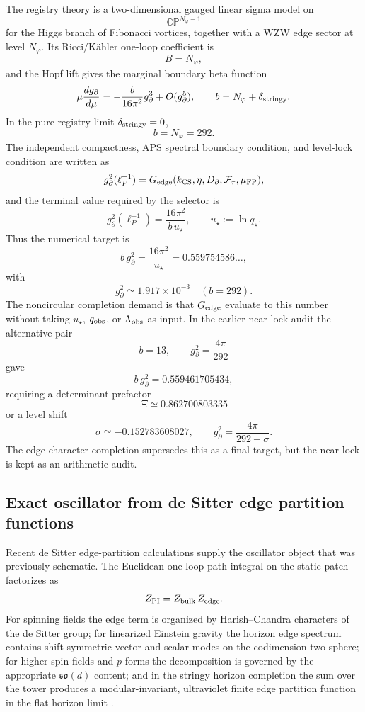 \documentclass[aps,prd,reprint,nofootinbib,superscriptaddress,floatfix]{revtex4-2}
\numberwithin{equation}{section}
\theoremstyle{definition}
\theoremstyle{plain}
\begin{document}
The registry theory is a two-dimensional gauged linear sigma model on
\[
\mathbb{CP}^{N_\varphi-1}
\]
for the Higgs branch of Fibonacci vortices, together with a WZW edge sector at
level \(N_\varphi\).  Its Ricci/Kähler one-loop coefficient is
\[
B=N_\varphi ,
\]
and the Hopf lift gives the marginal boundary beta function
\[
\mu\frac{d g_\partial}{d\mu}
=
-\frac{b}{16\pi^2}g_\partial^3+O(g_\partial^5),
\qquad
b=N_\varphi+\delta_{\rm stringy}.
\]
In the pure registry limit \(\delta_{\rm stringy}=0\),
\[
b=N_\varphi=292.
\]
The independent compactness, APS spectral boundary condition, and level-lock
condition are written as
\[
g_\partial^2(\ell_P^{-1})
=
G_{\rm edge}(k_{\rm CS},\eta,D_{\partial},\mathcal F_\tau,\mu_{\rm FP}),
\]
and the terminal value required by the selector is
\[
g_\partial^2(\ell_P^{-1})
=
\frac{16\pi^2}{b\,u_\star},
\qquad u_\star:=\ln q_\star .
\]
Thus the numerical target is
\[
b\,g_\partial^2
=
\frac{16\pi^2}{u_\star}
=
0.559754586\ldots ,
\]
with
\[
g_\partial^2\simeq1.917\times10^{-3}
\quad (b=292).
\]
The noncircular completion demand is that \(G_{\rm edge}\) evaluate to this
number without taking \(u_\star\), \(q_{\rm obs}\), or \(\Lambda_{\rm obs}\) as
input.  In the earlier near-lock audit the alternative pair
\[
b=13,\qquad g_\partial^2=\frac{4\pi}{292}
\]
gave
\[
b\,g_\partial^2=0.559461705434,
\]
requiring a determinant prefactor
\[
\Xi\simeq0.862700803335
\]
or a level shift
\[
\sigma\simeq-0.152783608027,\qquad
g_\partial^2=\frac{4\pi}{292+\sigma}.
\]
The edge-character completion supersedes this as a final target, but the
near-lock is kept as an arithmetic audit.

\subsection{Exact oscillator from de Sitter edge partition functions}

Recent de Sitter edge-partition calculations supply the oscillator object that
was previously schematic.  The Euclidean one-loop path integral on the static
patch factorizes as
\[
Z_{\rm PI}=Z_{\rm bulk}\,Z_{\rm edge}.
\]
For spinning fields the edge term is organized by Harish--Chandra characters of
the de Sitter group; for linearized Einstein gravity the horizon edge spectrum
contains shift-symmetric vector and scalar modes on the codimension-two
sphere; for higher-spin fields and \(p\)-forms the decomposition is governed
by the appropriate \(\mathfrak{so}(d)\) content; and in the stringy horizon
completion the sum over the tower produces a modular-invariant, ultraviolet
finite edge partition function in the flat horizon limit
\cite{DabholkarHarrisMoitra2026,Law2025dSEdge,LawLochab2026,BallLawWong2024,DonnellyWall2015,DavidMukherjee2021}.
\end{document}
